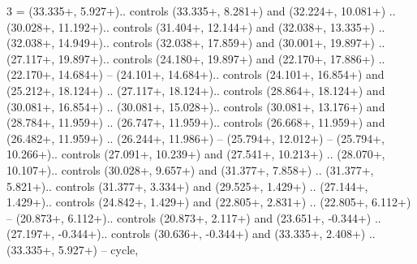 {3} = {(33.335+\ctpXshift, 5.927+\ctpYshift).. controls (33.335+\ctpXshift, 8.281+\ctpYshift) and (32.224+\ctpXshift, 10.081+\ctpYshift) .. (30.028+\ctpXshift, 11.192+\ctpYshift).. controls (31.404+\ctpXshift, 12.144+\ctpYshift) and (32.038+\ctpXshift, 13.335+\ctpYshift) .. (32.038+\ctpXshift, 14.949+\ctpYshift).. controls (32.038+\ctpXshift, 17.859+\ctpYshift) and (30.001+\ctpXshift, 19.897+\ctpYshift) .. (27.117+\ctpXshift, 19.897+\ctpYshift).. controls (24.180+\ctpXshift, 19.897+\ctpYshift) and (22.170+\ctpXshift, 17.886+\ctpYshift) .. (22.170+\ctpXshift, 14.684+\ctpYshift) -- (24.101+\ctpXshift, 14.684+\ctpYshift).. controls (24.101+\ctpXshift, 16.854+\ctpYshift) and (25.212+\ctpXshift, 18.124+\ctpYshift) .. (27.117+\ctpXshift, 18.124+\ctpYshift).. controls (28.864+\ctpXshift, 18.124+\ctpYshift) and (30.081+\ctpXshift, 16.854+\ctpYshift) .. (30.081+\ctpXshift, 15.028+\ctpYshift).. controls (30.081+\ctpXshift, 13.176+\ctpYshift) and (28.784+\ctpXshift, 11.959+\ctpYshift) .. (26.747+\ctpXshift, 11.959+\ctpYshift).. controls (26.668+\ctpXshift, 11.959+\ctpYshift) and (26.482+\ctpXshift, 11.959+\ctpYshift) .. (26.244+\ctpXshift, 11.986+\ctpYshift) -- (25.794+\ctpXshift, 12.012+\ctpYshift) -- (25.794+\ctpXshift, 10.266+\ctpYshift).. controls (27.091+\ctpXshift, 10.239+\ctpYshift) and (27.541+\ctpXshift, 10.213+\ctpYshift) .. (28.070+\ctpXshift, 10.107+\ctpYshift).. controls (30.028+\ctpXshift, 9.657+\ctpYshift) and (31.377+\ctpXshift, 7.858+\ctpYshift) .. (31.377+\ctpXshift, 5.821+\ctpYshift).. controls (31.377+\ctpXshift, 3.334+\ctpYshift) and (29.525+\ctpXshift, 1.429+\ctpYshift) .. (27.144+\ctpXshift, 1.429+\ctpYshift).. controls (24.842+\ctpXshift, 1.429+\ctpYshift) and (22.805+\ctpXshift, 2.831+\ctpYshift) .. (22.805+\ctpXshift, 6.112+\ctpYshift) -- (20.873+\ctpXshift, 6.112+\ctpYshift).. controls (20.873+\ctpXshift, 2.117+\ctpYshift) and (23.651+\ctpXshift, -0.344+\ctpYshift) .. (27.197+\ctpXshift, -0.344+\ctpYshift).. controls (30.636+\ctpXshift, -0.344+\ctpYshift) and (33.335+\ctpXshift, 2.408+\ctpYshift) .. (33.335+\ctpXshift, 5.927+\ctpYshift) -- cycle},
